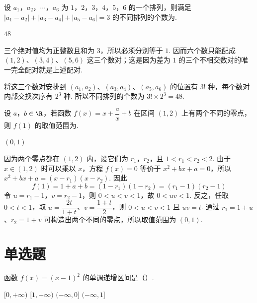\begin{problem}
设 \(a_1\)，\(a_2\)，\(\cdots\)，\(a_6\) 为 \(1\)，\(2\)，\(3\)，\(4\)，\(5\)，\(6\) 的一个排列，则满足 \(\lvert a_1-a_2\rvert+\lvert a_3-a_4\rvert+\lvert a_5-a_6\rvert=3\) 的不同排列的个数为\fillinblank{}.
\end{problem}

\begin{answer}
\(48\)
\end{answer}

\begin{solution}
三个绝对值均为正整数且和为 \(3\)，所以必须分别等于 \(1\). 因而六个数只能配成 \((1,2)\)、\((3,4)\)、\((5,6)\) 这三个数对；这是因为差为 \(1\) 的三个不相交数对的唯一完全配对就是上述配对.

将这三个数对安排到 \((a_1,a_2)\)、\((a_3,a_4)\)、\((a_5,a_6)\) 的位置有 \(3!\) 种，每个数对内部交换次序有 \(2^3\) 种. 所以不同排列的个数为 \(3!\times2^3=48\).
\end{solution}

\begin{problem}
设 \(a\)，\(b\in\R\)，若函数 \(f(x)=x+\dfrac{a}{x}+b\) 在区间 \((1,2)\) 上有两个不同的零点，则 \(f(1)\) 的取值范围为\fillinblank{}.
\end{problem}

\begin{answer}
\((0,1)\)
\end{answer}

\begin{solution}
因为两个零点都在 \((1,2)\) 内，设它们为 \(r_1\)，\(r_2\)，且 \(1<r_1<r_2<2\). 由于 \(x\in(1,2)\) 时可以乘以 \(x\)，方程 \(f(x)=0\) 等价于 \(x^2+bx+a=0\)，所以 \(x^2+bx+a=(x-r_1)(x-r_2)\). 因此
\[
f(1)=1+a+b=(1-r_1)(1-r_2)=(r_1-1)(r_2-1)
\]
令 \(u=r_1-1\)，\(v=r_2-1\)，则 \(0<u<v<1\)，故 \(0<uv<1\). 反之，任取 \(0<t<1\)，取 \(u=\dfrac{2t}{1+t}\)、\(v=\dfrac{1+t}{2}\)，则 \(0<u<v<1\) 且 \(uv=t\). 通过 \(r_1=1+u\)、\(r_2=1+v\) 可构造出两个不同的零点，所以取值范围为 \((0,1)\).
\end{solution}

\section{单选题}

\begin{problem}
函数 \(f(x)=(x-1)^2\) 的单调递增区间是（\quad）.

\choices
    {\([0,+\infty)\)}
    {\([1,+\infty)\)}
    {\((-\infty,0]\)}
    {\((-\infty,1]\)}
\end{problem}

